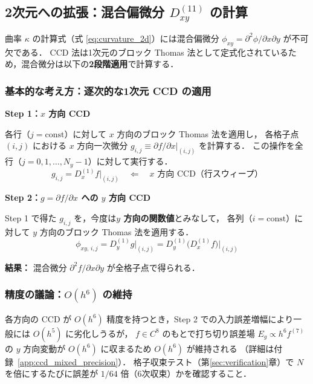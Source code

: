 \subsection{2次元への拡張：混合偏微分 \texorpdfstring{$D_{xy}^{(11)}$}{Dxy\^{}(11)} の計算}
\label{sec:ccd_mixed}

曲率 $\kappa$ の計算式（式 \eqref{eq:curvature_2d}）には混合偏微分 $\phi_{xy} = \partial^2\phi/\partial x\partial y$ が不可欠である．
CCD 法は1次元のブロック Thomas 法として定式化されているため，混合微分は以下の\textbf{2段階適用}で計算する．

\subsubsection{基本的な考え方：逐次的な1次元 CCD の適用}

\begin{tcolorbox}[defbox, title={混合微分 $\partial^2 f/\partial x\partial y$ の計算手順}]
\textbf{Step 1：$x$ 方向 CCD}

各行（$j = \text{const}$）に対して $x$ 方向のブロック Thomas 法を適用し，
各格子点 $(i,j)$ における $x$ 方向一次微分 $g_{i,j} \equiv \partial f/\partial x \big|_{(i,j)}$ を計算する．
この操作を全行（$j = 0, 1, \ldots, N_y-1$）に対して実行する．
\[
  g_{i,j} = D_x^{(1)} f \big|_{(i,j)} \quad \Leftarrow \quad x \text{ 方向 CCD（行スウィープ）}
\]

\textbf{Step 2：$g = \partial f/\partial x$ への $y$ 方向 CCD}

Step 1 で得た $g_{i,j}$ を，今度は\textbf{$y$ 方向の関数値}とみなして，
各列（$i = \text{const}$）に対して $y$ 方向のブロック Thomas 法を適用する．
\[
  \phi_{xy,\,i,j} = D_y^{(1)} g \big|_{(i,j)} = D_y^{(1)}\bigl(D_x^{(1)} f\bigr)\big|_{(i,j)}
\]

\textbf{結果：} 混合微分 $\partial^2 f/\partial x \partial y$ が全格子点で得られる．
\end{tcolorbox}

\subsubsection{精度の議論：$O(h^6)$ の維持}

各方向の CCD が $O(h^6)$ 精度を持つとき，Step 2 での入力誤差増幅により一般には $O(h^5)$ に劣化しうるが，
$f \in C^8$ のもとで打ち切り誤差場 $E_g \propto h^6 f^{(7)}$ の $y$ 方向変動が $O(h^6)$ に収まるため $O(h^6)$ が維持される
（詳細は付録~\ref{app:ccd_mixed_precision}）．
格子収束テスト（第\ref{sec:verification}章）で $N$ を倍にするたびに誤差が $1/64$ 倍（6次収束）かを確認すること．

